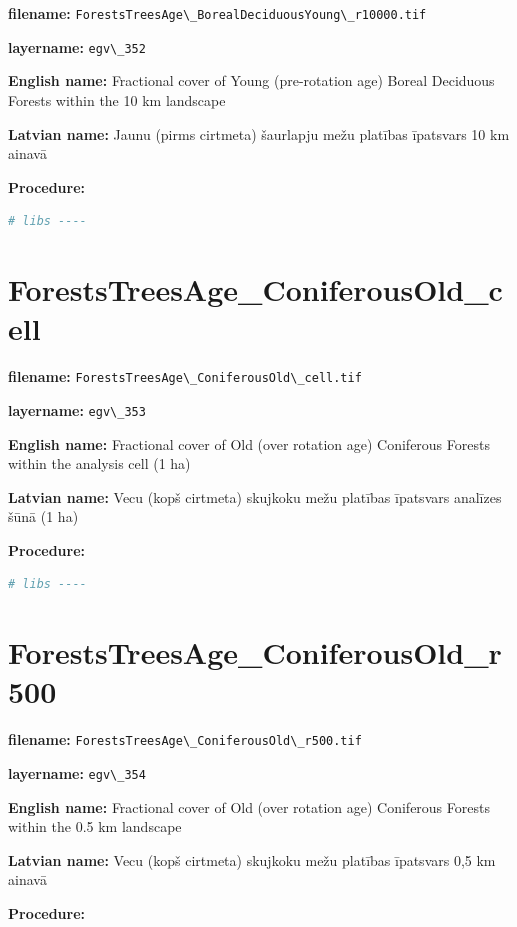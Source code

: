 \documentclass[
]{book}
\newcommand{\passthrough}[1]{#1}
\begin{document}
\textbf{filename:} \passthrough{\lstinline!ForestsTreesAge\_BorealDeciduousYoung\_r10000.tif!}

\textbf{layername:} \passthrough{\lstinline!egv\_352!}

\textbf{English name:} Fractional cover of Young (pre-rotation age) Boreal Deciduous Forests within the 10 km landscape

\textbf{Latvian name:} Jaunu (pirms cirtmeta) šaurlapju mežu platības īpatsvars 10 km ainavā

\textbf{Procedure:}

\begin{lstlisting}[language=R]
# libs ----
\end{lstlisting}

\section{ForestsTreesAge\_ConiferousOld\_cell}\label{ch06.353}

\textbf{filename:} \passthrough{\lstinline!ForestsTreesAge\_ConiferousOld\_cell.tif!}

\textbf{layername:} \passthrough{\lstinline!egv\_353!}

\textbf{English name:} Fractional cover of Old (over rotation age) Coniferous Forests within the analysis cell (1 ha)

\textbf{Latvian name:} Vecu (kopš cirtmeta) skujkoku mežu platības īpatsvars analīzes šūnā (1 ha)

\textbf{Procedure:}

\begin{lstlisting}[language=R]
# libs ----
\end{lstlisting}

\section{ForestsTreesAge\_ConiferousOld\_r500}\label{ch06.354}

\textbf{filename:} \passthrough{\lstinline!ForestsTreesAge\_ConiferousOld\_r500.tif!}

\textbf{layername:} \passthrough{\lstinline!egv\_354!}

\textbf{English name:} Fractional cover of Old (over rotation age) Coniferous Forests within the 0.5 km landscape

\textbf{Latvian name:} Vecu (kopš cirtmeta) skujkoku mežu platības īpatsvars 0,5 km ainavā

\textbf{Procedure:}
\end{document}
